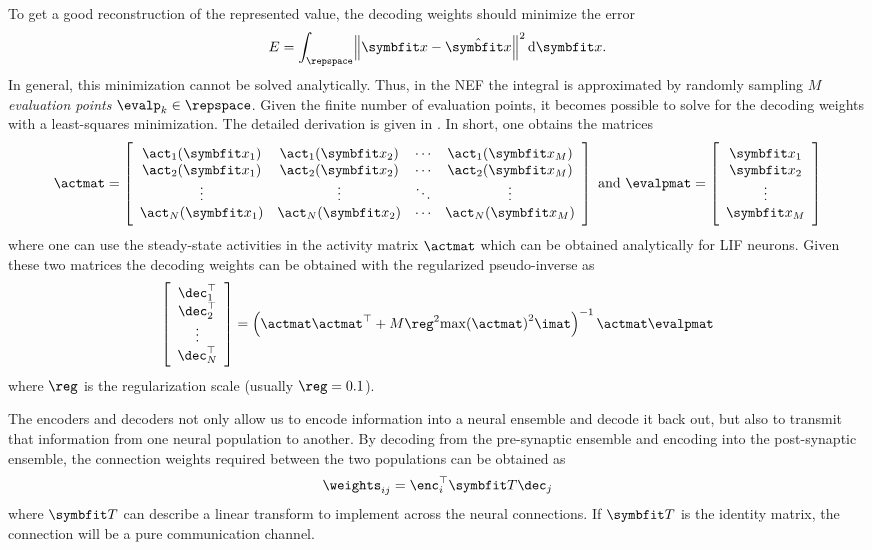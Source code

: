 To get a good reconstruction of the represented value, the decoding weights should minimize the error
\begin{equation}
    E = \int_{\repspace} \norm{\vc x - \hat{\vc x}}^2 \dif \vc x \text{.}
\end{equation}
In general, this minimization cannot be solved analytically.
Thus, in the NEF the integral is approximated by randomly sampling $M$ \emph{evaluation points} $\evalp_k \in \repspace$.
Given the finite number of evaluation points, it becomes possible to solve for the decoding weights with a least-squares minimization.
The detailed derivation is given in \textcite[Ch.~2]{eliasmith2003}.
In short, one obtains the matrices
\begin{equation}
    \actmat = \sbr{\begin{array}{cccc}
            \act_1(\vc x_1) & \act_1(\vc x_2) & \cdots & \act_1(\vc x_M) \\
            \act_2(\vc x_1) & \act_2(\vc x_2) & \cdots & \act_2(\vc x_M) \\
            \vdots & \vdots & \ddots & \vdots \\
            \act_N(\vc x_1) & \act_N(\vc x_2) & \cdots & \act_N(\vc x_M) \\
    \end{array}}
    \ \text{and}\ 
    \evalpmat = \sbr{\begin{array}{c}
            \vc x_1 \\ \vc x_2 \\ \vdots \\ \vc x_M
    \end{array}}
\end{equation}
where one can use the steady-state activities in the activity matrix $\actmat$ which can be obtained analytically for LIF neurons.
Given these two matrices the decoding weights can be obtained with the regularized pseudo-inverse as
\begin{equation}
    \sbr{\begin{array}{c}
            \dec_1\Tr \\ \dec_2\Tr \\ \vdots \\ \dec_N\Tr
        \end{array}} = \del{\actmat \actmat\Tr + M \reg^2 {\max(\actmat)}^2 \imat}^{-1} \actmat \evalpmat
\end{equation}
where $\reg$ is the regularization scale (usually $\reg = 0.1$).

The encoders and decoders not only allow us to encode information into a neural ensemble and decode it back out, but also to transmit that information from one neural population to another.
By decoding from the pre-synaptic ensemble and encoding into the post-synaptic ensemble, the connection weights required between the two populations can be obtained as
\begin{equation}
    \weights_{ij} = \enc_i\Tr \mat T \dec_j
\end{equation}
where $\mat T$ can describe a linear transform to implement across the neural connections.
If $\mat T$ is the identity matrix, the connection will be a pure communication channel.


